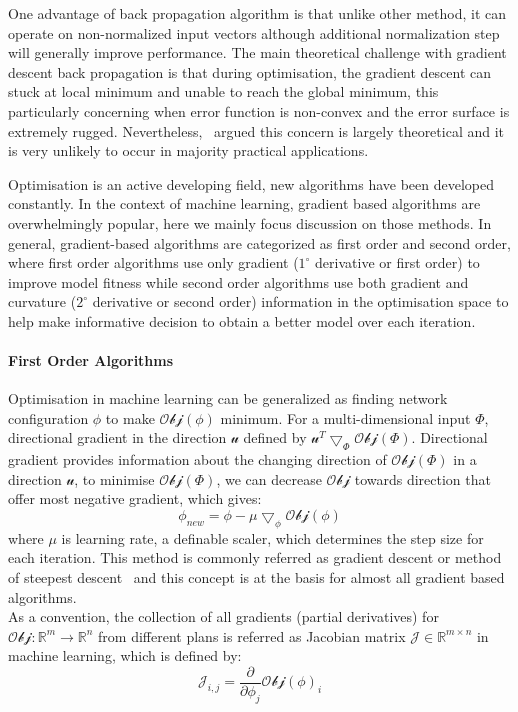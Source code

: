 One advantage of back propagation algorithm is that unlike other method, it can operate on non-normalized input vectors although additional normalization step will generally improve performance. \cite{Buckland:2002} The main theoretical challenge with gradient descent back propagation is that during optimisation, the gradient descent can stuck at local minimum and unable to reach the global minimum, this particularly concerning when error function is non-convex and the error surface is extremely rugged. Nevertheless,~\citet{LeCun_2015} argued this concern is largely theoretical and it is very unlikely to occur in majority practical applications.

Optimisation is an active developing field, new algorithms have been developed constantly. In the context of machine learning, gradient based algorithms are overwhelmingly popular, here we mainly focus discussion on those methods. In general, gradient-based algorithms are categorized as first order and second order, where first order algorithms use only gradient ($1^\circ$ derivative or first order) to improve model fitness while second order algorithms use both gradient and curvature ($2^\circ$ derivative or second order) information in the optimisation space to help make informative decision to obtain a better model over each iteration. \\

\paragraph {First Order Algorithms}
Optimisation in machine learning can be generalized as finding network configuration $\phi$ to make $\mathcal{Obj}(\phi)$ minimum. For a multi-dimensional input $\Phi$, directional gradient in the direction $\mathcal{u}$ defined by $\mathcal{u}^T\bigtriangledown_{\Phi}\mathcal{Obj}(\Phi)$. Directional gradient provides information about the changing direction of $\mathcal{Obj}(\Phi)$ in a direction $\mathcal{u}$, to minimise $\mathcal{Obj}(\Phi)$, we can decrease $\mathcal{Obj}$ towards direction that offer most negative gradient, which gives:
\begin{equation}
    \phi_{new} = \phi - \mu\bigtriangledown_{\phi}\mathcal{Obj}(\phi)
\end{equation}
where $\mu$ is learning rate, a definable scaler, which determines the step size for each iteration. This method is commonly referred as gradient descent or method of steepest descent~\cite{Debye_1909} and this concept is at the basis for almost all gradient based algorithms. \\
As a convention, the collection of all gradients (partial derivatives) for $\mathcal{Obj}:\mathbb{R}^m \to \mathbb{R}^n$ from different plans is referred as Jacobian matrix $\mathcal{J} \in \mathbb{R}^{m \times n}$ in machine learning, which is defined by:
\begin{equation}
    \mathcal{J}_{i,j} = \frac{\partial}{\partial \phi_j}\mathcal{Obj}(\phi)_i
\end{equation}

